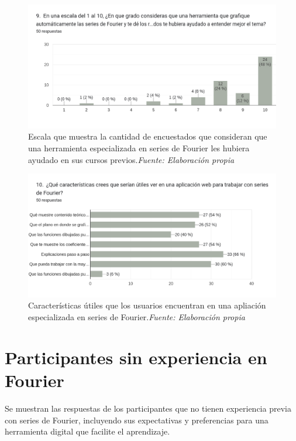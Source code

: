 \begin{figure}[H]
	\centering
	\includegraphics[width=1\textwidth]{img/appendixA/9_grado_de_ayuda_Fourier.png}
	\caption[Escala que muestra la cantidad de encuestados que consideran que una herramienta especializada en series de Fourier les hubiera ayudado en sus cursos previos.]{Escala que muestra la cantidad de encuestados que consideran que una herramienta especializada en series de Fourier les hubiera ayudado en sus cursos previos.\textit{Fuente: Elaboración propia}}
	\label{fig:app1_grado_de_ayuda_Fourier}  %
\end{figure}

\begin{figure}[H]
	\centering
	\includegraphics[width=1\textwidth]{img/appendixA/10_cosas_utiles_App_Fourier.png}
	\caption[Características útiles que los usuarios encuentran en una apliación especializada en series de Fourier.]{Características útiles que los usuarios encuentran en una apliación especializada en series de Fourier.\textit{Fuente: Elaboración propia}}
	\label{fig:app1_cosas_utiles_App_Fourier}  %
\end{figure}

\newpage
\section{Participantes sin experiencia en Fourier}
Se muestran las respuestas de los participantes que no tienen experiencia previa con series de Fourier, incluyendo sus expectativas y preferencias para una herramienta digital que facilite el aprendizaje.

